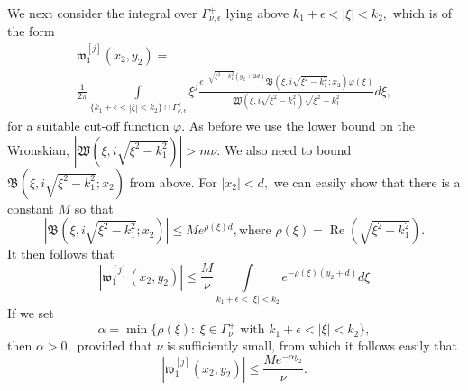 \documentclass[11pt]{article}
\newcommand\fw{\mathfrak w}
\newcommand\fW{\mathfrak W}
\newcommand\fB{\mathfrak B}
\renewcommand\Re{\operatorname{Re}}
\theoremstyle{definition}
\theoremstyle{remark}
\begin{document}
 We next consider the integral over $\Gamma_{\nu,\epsilon}^+$ lying above
 $k_1+\epsilon<|\xi|<k_2,$ which is of the form
 \begin{multline}
    \fw^{[j]}_{1}(x_2,y_2)=\\ \frac{1}{2\pi}\int\limits_{\{k_1+\epsilon<|\xi|<k_2\}\cap
      \Gamma_{\nu,\epsilon}^+}\xi^j\frac{e^{-\sqrt{\xi^2-k_1^2}(y_2+2d)}
      \fB(\xi,i\sqrt{\xi^2-k_1^2};x_2)\varphi(\xi)}
       {\fW(\xi,i\sqrt{\xi^2-k_1^2})\sqrt{\xi^2-k_1^2}}d\xi,
 \end{multline}
 for a suitable cut-off function $\varphi.$ As before we use the lower bound on
 the Wronskian, $|\fW(\xi,i\sqrt{\xi^2-k_1^2})|>m\nu.$ We also need to bound
 $\fB(\xi,i\sqrt{\xi^2-k_1^2};x_2)$ from above. For
 $|x_2|<d,$ we can easily show that there is a constant $M$ so that
   \begin{equation}
     |\fB(\xi,i\sqrt{\xi^2-k_1^2};x_2)|\leq Me^{\rho(\xi) d},\text{
       where }\rho(\xi)=\Re\left(\sqrt{\xi^2-k_1^2}\right).
   \end{equation}
   It then follows that
   \begin{equation}
     | \fw^{[j]}_{1}(x_2,y_2)|\leq \frac{M}{\nu}
     \int\limits_{k_1+\epsilon<|\xi|<k_2}e^{-\rho(\xi)(y_2+d)}d\xi
   \end{equation}
   If we set
   \begin{equation}
   \alpha=\min\{\rho(\xi):\:
   \xi\in\Gamma_{\nu}^+\text{ with }k_1+\epsilon<|\xi|<k_2 \}, 
   \end{equation}
 then $\alpha>0,$ provided that $\nu$ is sufficiently small,
   from which it follows easily that
   \begin{equation}
     |\fw^{[j]}_{1}(x_2,y_2)|\leq \frac{Me^{-\alpha y_2}}{\nu}.
   \end{equation}
   
\end{document}
